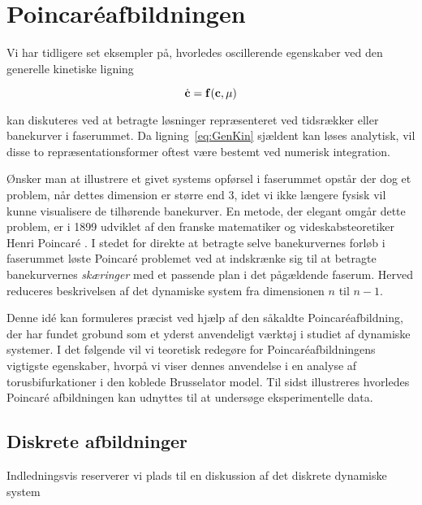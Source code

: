 \chapter{Poincar\'{e}afbild\-ningen}
Vi har tidligere set eksempler p{\aa}, hvorledes oscillerende
egenskaber ved den generelle kinetiske ligning

\begin{equation}
 \dot{\bf c} = {\bf f}({\bf c},\mu)
 \label{eq:GenKin}
\end{equation}

kan diskuteres ved at betragte l{\o}sninger
repr{\ae}senteret ved tidsr{\ae}kker eller banekurver i
faserummet. Da ligning~\ref{eq:GenKin} sj{\ae}ldent kan
l{\o}ses analytisk, vil disse to repr{\ae}sentationsformer
oftest v{\ae}re bestemt ved numerisk integration.

\vspace{2.5mm}
{\O}nsker man at illustrere et givet systems opf{\o}rsel i
faserummet opst{\aa}r der dog et problem, n{\aa}r dettes
dimension er st{\o}rre end $3$, idet vi ikke l{\ae}ngere
fysisk vil kunne visualisere de tilh{\o}rende banekurver.
En metode, der elegant omg{\aa}r dette problem, er i 1899
udviklet af den franske matematiker og videskabsteoretiker
Henri Poincar\'{e} \cite{PoinOrig}. I stedet for direkte at
betragte selve banekurvernes forl{\o}b i faserummet
l{\o}ste Poincar\'{e} problemet ved at indskr{\ae}nke sig
til at betragte banekurvernes {\em sk{\ae}ringer} med et
passende plan i det p{\aa}g{\ae}ldende faserum. Herved
reduceres beskrivelsen af det dynamiske system fra
dimensionen $n$ til $n-1$.

\vspace{2.5mm}
Denne id\'{e} kan formuleres pr{\ae}cist ved hj{\ae}lp af
den s{\aa}kaldte Poincar\'{e}afbild\-ning, der har fundet
grobund som et yderst anvendeligt v{\ae}rkt{\o}j i studiet
af dynamiske systemer. I det f{\o}lgende vil vi teoretisk
redeg{\o}re for Poincar\'{e}\-afbild\-ningens vigtigste
egenskaber, hvorp{\aa} vi viser dennes anvendelse i en
analyse af torusbifurkationer i den koblede Brusselator
model. Til sidst illustreres hvorledes Poincar\'{e}
afbild\-ningen kan udnyttes til at unders{\o}ge
eksperimentelle data.

\section{Diskrete afbild\-ninger}
\label{sec:DiskMap}
Indledningsvis reserverer vi plads til en diskussion af det
diskrete dynamiske system

